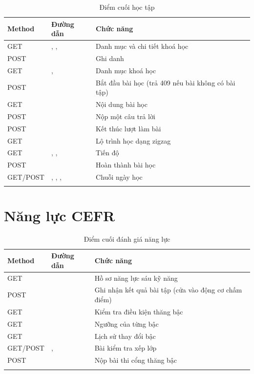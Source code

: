 \begin{longtable}{L{2.8cm} L{6.0cm} L{4.8cm}}
\toprule
\textbf{Method} & \textbf{Đường dẫn} & \textbf{Chức năng}\\
\midrule
\endhead
GET & , ,  & Danh mục và chi tiết khoá học\\
POST &  & Ghi danh\\
GET & ,  & Danh mục khoá học\\
POST &  & Bắt đầu bài học (trả 409 nếu bài không có bài tập)\\
GET &  & Nội dung bài học\\
POST &  & Nộp một câu trả lời\\
POST &  & Kết thúc lượt làm bài\\
GET &  & Lộ trình học dạng zigzag\\
GET & , ,  & Tiến độ\\
POST &  & Hoàn thành bài học\\
GET/POST & , , ,  & Chuỗi ngày học\\
\bottomrule
\caption{Điểm cuối học tập}
\end{longtable}

\section{Năng lực CEFR}

\begin{longtable}{L{2.8cm} L{6.0cm} L{4.8cm}}
\toprule
\textbf{Method} & \textbf{Đường dẫn} & \textbf{Chức năng}\\
\midrule
\endhead
GET &  & Hồ sơ năng lực sáu kỹ năng\\
POST &  & Ghi nhận kết quả bài tập (cửa vào động cơ chấm điểm)\\
GET &  & Kiểm tra điều kiện thăng bậc\\
GET &  & Ngưỡng của từng bậc\\
GET &  & Lịch sử thay đổi bậc\\
GET/POST & ,  & Bài kiểm tra xếp lớp\\
POST &  & Nộp bài thi cổng thăng bậc\\
\bottomrule
\caption{Điểm cuối đánh giá năng lực}
\end{longtable}

